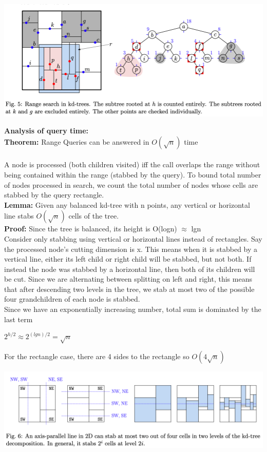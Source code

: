 \documentclass{article}
\begin{document}
  \begin{center}
  \includegraphics[scale=0.4]{RangeSearchExample}
  \end{center}
  \textbf{Analysis of query time: }\\
  \textbf{Theorem: }Range Queries can be answered in $O(\sqrt{n})$ time \\ \\
  A node is processed (both children visited) iff the call overlaps the range without being contained within the range (stabbed by the query). To bound total number of nodes processed in search, we count the total number of nodes whose cells are stabbed by the query rectangle. \\
  \textbf{Lemma: }Given any balanced kd-tree with n points, any vertical or horizontal line stabs $O(\sqrt{n})$ cells of the tree. \\
  \textbf{Proof: }Since the tree is balanced, its height is O(logn) $\approx$ lgn\\
  Consider only stabbing using vertical or horizontal lines instead of rectangles. Say the processed node's cutting dimension is x. This means when it is stabbed by a vertical line, either its left child or right child will be stabbed, but not both. If instead the node was stabbed by a horizontal line, then both of its children will be cut. Since we are alternating between splitting on left and right, this means that after descending two levels in the tree, we stab at most two of the possible four grandchildren of each node is stabbed.\\
  Since we have an exponentially increasing number, total sum is dominated by the last term
  \begin{center}
    $2^{h/2} \approx 2^{(lgn)/2} = \sqrt{n}$
  \end{center}
  For the rectangle case, there are 4 sides to the rectangle so $O(4\sqrt{n})$
  \begin{center}
  \includegraphics[scale=0.4]{RangeQueryProof}
  \end{center}
\end{document}
